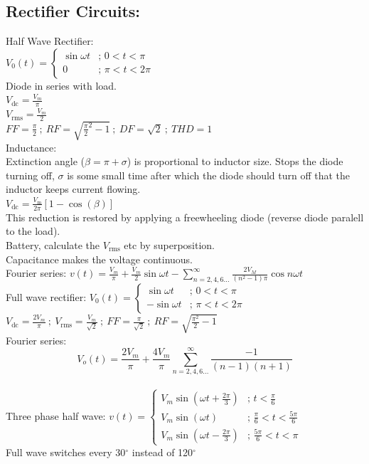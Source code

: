 \documentclass[10pt,landscape,a4paper]{article}
\newcommand{\subs}[1]{\ensuremath{_{\text{#1}}}}
\newcommand{\rms}{\subs{rms}}
\newcommand{\rangedeftwo}[4]
{\ensuremath{
	\left\{
	\begin{array}{ll}
		#1 & \text{; } #2 \\
		#3 & \text{; } #4	
	\end{array}
	\right.
}}
\newcommand{\rangedefthree}[6]
{\ensuremath{
		\left\{
		\begin{array}{ll}
			#1 & \text{; } #2 \\
			#3 & \text{; } #4 \\
			#5 & \text{; } #6
		\end{array}
		\right.
	}
}
\begin{document}
\begin{multicols*}{4}
		\section{Rectifier Circuits:}
		Half Wave Rectifier:\\
		$ V_0(t) = \rangedeftwo{\sin\omega t}{0<t<\pi}{0}{\pi<t<2\pi} $\\
		Diode in series with load.\\
		$ V\subs{dc} = \frac{V_m}{\pi} $\\
		$ V\rms = \frac{V_m}{2} $\\
		$ FF = \frac{\pi}{2}~;~RF = \sqrt{\frac{\pi}{2}^2-1}~;~DF = \sqrt{2} ~;~THD = 1 $\\
		Inductance:\\
		Extinction angle ($ \beta = \pi + \sigma $) is proportional to inductor size. Stops the diode turning off, $ \sigma $ is some small time after which the diode should turn off that the inductor keeps current flowing.\\
		$ V\subs{dc} = \frac{V\subs{m}}{2\pi}[1-\cos(\beta)] $\\
		This reduction is restored by applying a freewheeling diode (reverse diode paralell to the load).\\
		Battery, calculate the $ V\rms $ etc by superposition.\\
		Capacitance makes the voltage continuous.\\
		Fourier series: $ v(t) = \frac{V_m}{\pi}+\frac{V_m}{2}\sin\omega t -\sum_{n=2,4,6...}^{\infty} \frac{2V_M}{(n^2-1)\pi}\cos n\omega t $\\ 
		Full wave rectifier:
		$ V_0(t) = \rangedeftwo{\sin\omega t}{0<t<\pi}{-\sin\omega t}{\pi<t<2\pi} $\\
		$ V\subs{dc} = \frac{2V_m}{\pi}~;~V\rms=\frac{V_m}{\sqrt{2}}~;~FF=\frac{\pi}{\sqrt{2}}~;~RF=\sqrt{\frac{\pi^2}{2}-1}$\\
		Fourier series:  \[ V_o(t) = \frac{2V_m}{\pi} + \frac{4V_m}{\pi}\sum_{n=2,4,6...}^{\infty} \frac{-1}{(n-1)(n+1)} \]\\
		Three phase half wave: $ v(t) = \rangedefthree {V_m\sin(\omega t + \frac{2\pi}{3})} {t<\frac{\pi}{6}} {V_m\sin(\omega t)} {\frac{\pi}{6}<t<\frac{5\pi}{6}} {V_m\sin(\omega t - \frac{2\pi}{3})} {\frac{5\pi}{6}<t<\pi} $\\
		Full wave switches every 30$^\circ$ instead of 120$^\circ$\\
		

\end{multicols*}
\end{document}

